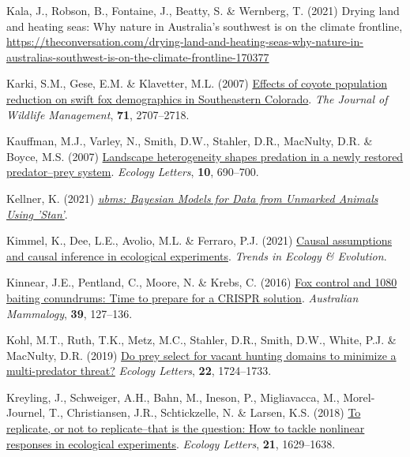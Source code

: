 \documentclass[11pt,a4paper,titlepage,twoside,openright]{style/unimelbthesis}
\newenvironment{CSLReferences}%
  {}%
  {\par}
\begin{document}
\begin{mainmatter}
\begin{CSLReferences}{1}{0}
\leavevmode{}%
Kala, J., Robson, B., Fontaine, J., Beatty, S. \& Wernberg, T. (2021) Drying land and heating seas: Why nature in {A}ustralia's southwest is on the climate frontline, \url{https://theconversation.com/drying-land-and-heating-seas-why-nature-in-australias-southwest-is-on-the-climate-frontline-170377}

\leavevmode{}%
Karki, S.M., Gese, E.M. \& Klavetter, M.L. (2007) \href{https://doi.org/10.2193/2006-275}{Effects of coyote population reduction on swift fox demographics in {Southeastern Colorado}}. \emph{The Journal of Wildlife Management}, \textbf{71}, 2707--2718.

\leavevmode{}%
Kauffman, M.J., Varley, N., Smith, D.W., Stahler, D.R., MacNulty, D.R. \& Boyce, M.S. (2007) \href{https://doi.org/10.1111/j.1461-0248.2007.01059.x}{Landscape heterogeneity shapes predation in a newly restored predator--prey system}. \emph{Ecology Letters}, \textbf{10}, 690--700.

\leavevmode{}%
Kellner, K. (2021) \emph{\href{https://kenkellner.com/ubms/}{{ubms}: {B}ayesian Models for Data from Unmarked Animals Using 'Stan'}}.

\leavevmode{}%
Kimmel, K., Dee, L.E., Avolio, M.L. \& Ferraro, P.J. (2021) \href{https://doi.org/10.1016/j.tree.2021.08.008}{Causal assumptions and causal inference in ecological experiments}. \emph{Trends in Ecology \& Evolution}.

\leavevmode{}%
Kinnear, J.E., Pentland, C., Moore, N. \& Krebs, C. (2016) \href{https://doi.org/10.1071/AM16020}{Fox control and 1080 baiting conundrums: Time to prepare for a {CRISPR} solution}. \emph{{A}ustralian Mammalogy}, \textbf{39}, 127--136.

\leavevmode{}%
Kohl, M.T., Ruth, T.K., Metz, M.C., Stahler, D.R., Smith, D.W., White, P.J. \& MacNulty, D.R. (2019) \href{https://doi.org/10.1111/ele.13319}{Do prey select for vacant hunting domains to minimize a multi-predator threat?} \emph{Ecology Letters}, \textbf{22}, 1724--1733.

\leavevmode{}%
Kreyling, J., Schweiger, A.H., Bahn, M., Ineson, P., Migliavacca, M., Morel-Journel, T., Christiansen, J.R., Schtickzelle, N. \& Larsen, K.S. (2018) \href{https://doi.org/10.1111/ele.13134}{To replicate, or not to replicate--that is the question: How to tackle nonlinear responses in ecological experiments}. \emph{Ecology Letters}, \textbf{21}, 1629--1638.


\end{CSLReferences}
\end{mainmatter}
\end{document}
